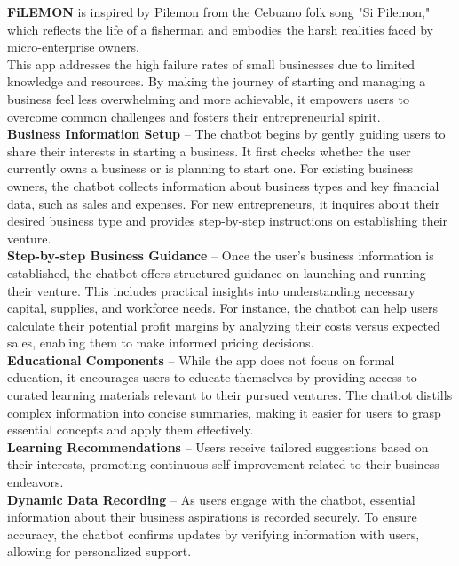 \documentclass{article}
\begin{document}
\textbf{FiLEMON} is inspired by Pilemon from the Cebuano folk song "Si Pilemon," which reflects the life of a fisherman and embodies the harsh realities faced by micro-enterprise owners. \\

This app addresses the high failure rates of small businesses due to limited knowledge and resources. By making the journey of starting and managing a business feel less overwhelming and more achievable, it empowers users to overcome common challenges and fosters their entrepreneurial spirit.\\

\textbf{Business Information Setup} – The chatbot begins by gently guiding users to share their interests in starting a business. It first checks whether the user currently owns a business or is planning to start one. For existing business owners, the chatbot collects information about business types and key financial data, such as sales and expenses. For new entrepreneurs, it inquires about their desired business type and provides step-by-step instructions on establishing their venture.\\

\textbf{Step-by-step Business Guidance} – Once the user's business information is established, the chatbot offers structured guidance on launching and running their venture. This includes practical insights into understanding necessary capital, supplies, and workforce needs. For instance, the chatbot can help users calculate their potential profit margins by analyzing their costs versus expected sales, enabling them to make informed pricing decisions.\\

\textbf{Educational Components} – While the app does not focus on formal education, it encourages users to educate themselves by providing access to curated learning materials relevant to their pursued ventures. The chatbot distills complex information into concise summaries, making it easier for users to grasp essential concepts and apply them effectively.\\

\textbf{Learning Recommendations} – Users receive tailored suggestions based on their interests, promoting continuous self-improvement related to their business endeavors.\\

\textbf{Dynamic Data Recording} – As users engage with the chatbot, essential information about their business aspirations is recorded securely. To ensure accuracy, the chatbot confirms updates by verifying information with users, allowing for personalized support.\\
\end{document}
